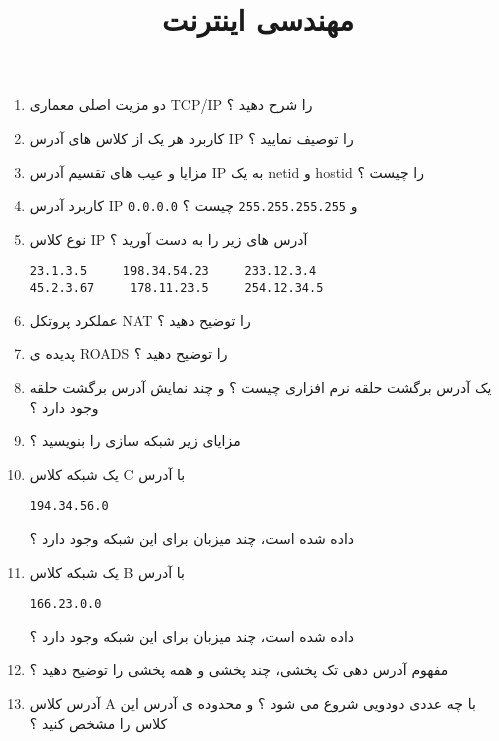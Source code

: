 \documentclass{article}
\begin{document}
\title{مهندسی اینترنت}
\maketitle

\begin{enumerate}
\item    دو مزیت اصلی معماری TCP/IP را شرح دهید ؟

\item کاربرد هر یک از کلاس های آدرس IP را توصیف نمایید ؟

\item مزایا و عیب های تقسیم آدرس IP به یک netid و hostid را چیست ؟

\item کاربرد آدرس IP \lstinline{0.0.0.0} و  \lstinline{255.255.255.255} چیست ؟

\item نوع کلاس IP آدرس های زیر را به دست آورید ؟\begin{lstlisting}
23.1.3.5     198.34.54.23     233.12.3.4 
45.2.3.67     178.11.23.5     254.12.34.5 
\end{lstlisting}


\item عملکرد پروتکل NAT را توضیح دهید ؟

\item پدیده ی ROADS را توضیح دهید ؟

\item یک آدرس برگشت حلقه نرم افزاری چیست ؟ و چند نمایش آدرس برگشت حلقه وجود دارد ؟

\item مزایای زیر شبکه سازی را بنویسید ؟

\item یک شبکه کلاس C با آدرس 
\begin{lstlisting}
194.34.56.0
\end{lstlisting}
داده شده است، چند میزبان برای  این شبکه وجود دارد ؟ 

\item یک شبکه کلاس B با آدرس 
\begin{lstlisting}
166.23.0.0
\end{lstlisting}
داده شده است، چند میزبان برای  این شبکه وجود دارد ؟ 

\item مفهوم آدرس دهی تک پخشی، چند پخشی و همه پخشی را توضیح دهید ؟

\item آدرس کلاس A با چه عددی دودویی شروع می شود ؟ و محدوده ی آدرس این کلاس را مشخص کنید ؟


\end{enumerate}
\end{document}
